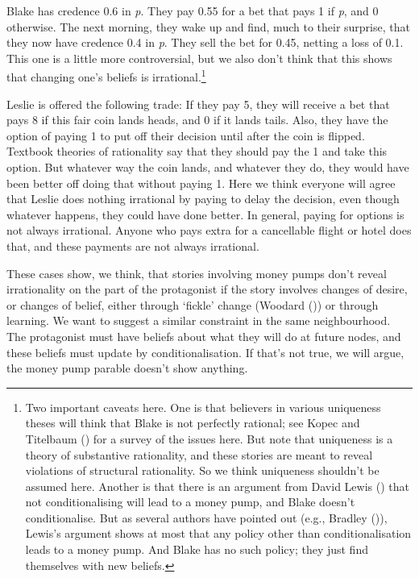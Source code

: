 \documentclass[
  11pt,
  letterpaper,
  DIV=11,
  numbers=noendperiod,
  twoside]{scrartcl}
\begin{document}
Blake has credence 0.6 in \emph{p}. They pay 0.55 for a bet that pays 1
if \emph{p}, and 0 otherwise. The next morning, they wake up and find,
much to their surprise, that they now have credence 0.4 in \emph{p}.
They sell the bet for 0.45, netting a loss of 0.1. This one is a little
more controversial, but we also don't think that this shows that
changing one's beliefs is irrational.\footnote{Two important caveats
  here. One is that believers in various uniqueness theses will think
  that Blake is not perfectly rational; see Kopec and Titelbaum
  () for a survey of the issues
  here. But note that uniqueness is a theory of substantive rationality,
  and these stories are meant to reveal violations of structural
  rationality. So we think uniqueness shouldn't be assumed here. Another
  is that there is an argument from David Lewis
  () that not conditionalising will lead
  to a money pump, and Blake doesn't conditionalise. But as several
  authors have pointed out (e.g., Bradley
  ()), Lewis's argument shows at most
  that any policy other than conditionalisation leads to a money pump.
  And Blake has no such policy; they just find themselves with new
  beliefs.}

Leslie is offered the following trade: If they pay 5, they will receive
a bet that pays 8 if this fair coin lands heads, and 0 if it lands
tails. Also, they have the option of paying 1 to put off their decision
until after the coin is flipped. Textbook theories of rationality say
that they should pay the 1 and take this option. But whatever way the
coin lands, and whatever they do, they would have been better off doing
that without paying 1. Here we think everyone will agree that Leslie
does nothing irrational by paying to delay the decision, even though
whatever happens, they could have done better. In general, paying for
options is not always irrational. Anyone who pays extra for a
cancellable flight or hotel does that, and these payments are not always
irrational.

These cases show, we think, that stories involving money pumps don't
reveal irrationality on the part of the protagonist if the story
involves changes of desire, or changes of belief, either through
`fickle' change (Woodard ()) or through
learning. We want to suggest a similar constraint in the same
neighbourhood. The protagonist must have beliefs about what they will do
at future nodes, and these beliefs must update by conditionalisation. If
that's not true, we will argue, the money pump parable doesn't show
anything.
\end{document}
